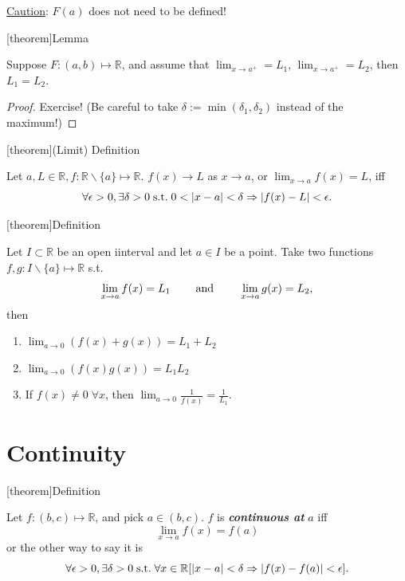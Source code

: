 \documentclass[12pt]{report}
\theoremstyle{definition}
\begin{document}
\underline{Caution}: $F(a)$ does not need to be defined!

[theorem]{Lemma}
\begin{left and right limit are equal}
    Suppose $F:(a,b) \mapsto \mathbb{R}$, and assume that $\lim_{x \rightarrow{}a^{+}} = L_1$,
    $\lim_{x \rightarrow{}a^{+}} = L_2$, then $L_1 = L_2$.
\end{left and right limit are equal}

\begin{proof}
    Exercise! (Be careful to take $\delta := \min{(\delta_1, \delta_2)}$
    instead of the maximum!)
\end{proof}

[theorem]{(Limit) Definition}
\begin{limit definition}
    Let $a,L \in\mathbb{R}, f:\mathbb{R}\backslash\{a\}\mapsto\mathbb{R}$.
    $f(x)\rightarrow{}L$ as $x\rightarrow{}a$,
    or $\lim_{x\rightarrow{}a}f(x) = L$, iff\[
        \forall \epsilon>0, \exists \delta>0 \;\textnormal{s.t.}\;
        0<|x-a|<\delta \Rightarrow{}|f(x)-L|<\epsilon.
    \]
\end{limit definition}

[theorem]{Definition}
\begin{Algebra of limits}
    Let $I\subset \mathbb{R}$ be an open iinterval and let $a\in I$ be a point.
    Take two functions $f,g:I\backslash\{a\}\mapsto\mathbb{R}$ s.t.\[
        \lim_{x\rightarrow{}a} f(x) = L_1 \qquad\;\textnormal{and}\;\qquad
        \lim_{x\to a} g(x) = L_2,
    \]then
    \begin{enumerate}
        \item $\lim_{a\to 0}(f(x)+g(x)) = L_1 + L_2$
        \item $\lim_{a\rightarrow{}0}(f(x)g(x)) = L_1L_2$
        \item If $f(x)\neq 0 \;\forall x$, then $\lim_{a\to{}0}\frac{1}{f(x)}=\frac{1}{L_1}$.
    \end{enumerate}
\end{Algebra of limits}

\section{Continuity}\label{sec:continuity}

[theorem]{Definition}
\begin{continuous at a}
    Let $f:(b,c)\mapsto\mathbb{R}$, and pick $a\in(b,c)$.
    $f$ is \textbf{\emph{continuous at}} $a$ iff\[
        \lim_{x\rightarrow{}a}f(x) = f(a)
    \]or the other way to say it is\[
        \forall \epsilon>0, \exists \delta>0 \;\textnormal{s.t.}\;
        \forall x\in\mathbb{R}[|x-a|<\delta \Rightarrow{}|f(x) - f(a)|<\epsilon].
    \]
\end{continuous at a}
\end{document}
